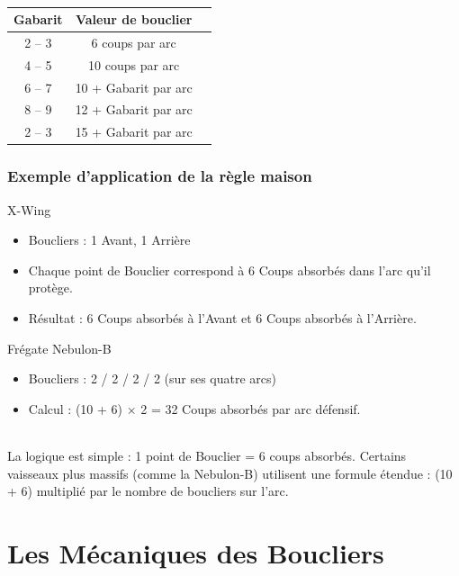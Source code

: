 \documentclass{article}
\begin{document}
\paragraph{}
\begin{tabular}{|c|c|c|}
	\hline 
	\cellcolor{DarkRed} {\textcolor{PureWhite}{\textbf{Gabarit}}} & \cellcolor{DarkRed} {\textcolor{PureWhite}{\textbf{Valeur de bouclier}}} \\ 
	\hline 
	2 -- 3 & 6 coups par arc \\ 
	\hline 
	4 -- 5 & 10 coups par arc \\ 
	\hline 
	6 -- 7 & 10 + Gabarit par arc \\ 
	\hline 
	8 -- 9 & 12 + Gabarit par arc \\ 
	\hline 
	2 -- 3 & 15 + Gabarit par arc \\ 
	\hline 
\end{tabular}


\section*{Exemple d’application de la règle maison}
X-Wing
\begin{itemize}
	\item Boucliers : 1 Avant, 1 Arrière
	\item Chaque point de Bouclier correspond à 6 Coups absorbés dans l’arc qu’il protège.
	\item Résultat : 6 Coups absorbés à l’Avant et 6 Coups absorbés à l’Arrière.
\end{itemize}

Frégate Nebulon-B
\begin{itemize}
	\item Boucliers : 2 / 2 / 2 / 2 (sur ses quatre arcs)
	\item Calcul : (10 + 6) × 2 = 32 Coups absorbés par arc défensif.
\end{itemize}

\paragraph{}
La logique est simple : 1 point de Bouclier = 6 coups absorbés. Certains vaisseaux plus massifs (comme la Nebulon-B) utilisent une formule étendue : (10 + 6) multiplié par le nombre de boucliers sur l’arc.


\part*{Les Mécaniques des Boucliers}
\end{document}
